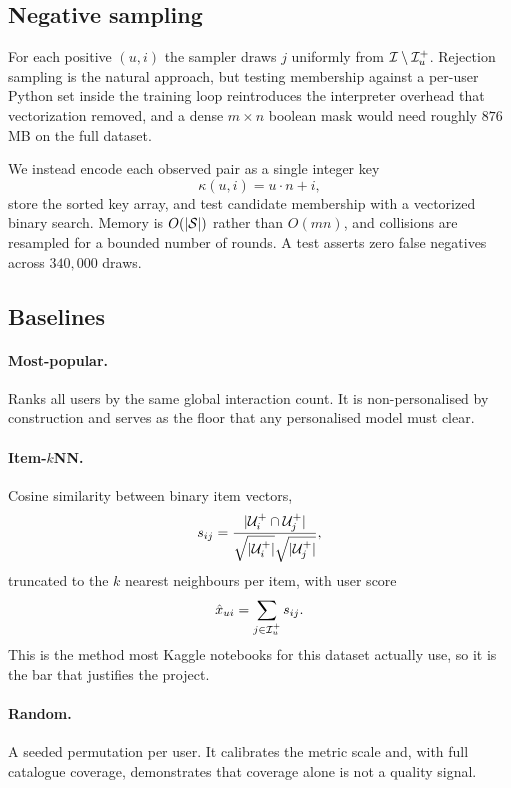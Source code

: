 \subsection{Negative sampling}

For each positive $(u,i)$ the sampler draws $j$ uniformly from
$\mathcal{I} \setminus \mathcal{I}_u^{+}$. Rejection sampling is the natural approach,
but testing membership against a per-user Python set inside the training loop
reintroduces the interpreter overhead that vectorization removed, and a dense
$m \times n$ boolean mask would need roughly $876$\,MB on the full dataset.

We instead encode each observed pair as a single integer key
\begin{equation}
  \kappa(u,i) = u \cdot n + i ,
\end{equation}
store the sorted key array, and test candidate membership with a vectorized
binary search. Memory is $O(|\mathcal{S}|)$ rather than $O(mn)$, and collisions are
resampled for a bounded number of rounds. A test asserts zero false negatives
across $340{,}000$ draws.

\subsection{Baselines}

\paragraph{Most-popular.} Ranks all users by the same global interaction
count. It is non-personalised by construction and serves as the floor that
any personalised model must clear.

\paragraph{Item-$k$NN.} Cosine similarity between binary item vectors,
\begin{equation}
  s_{ij} = \frac{\lvert \mathcal{U}_i^{+} \cap \mathcal{U}_j^{+} \rvert}
                {\sqrt{\lvert \mathcal{U}_i^{+} \rvert}\sqrt{\lvert \mathcal{U}_j^{+} \rvert}} ,
\end{equation}
truncated to the $k$ nearest neighbours per item, with user score
\begin{equation}
  \hat{x}_{ui} = \sum_{j \in \mathcal{I}_u^{+}} s_{ij} .
\end{equation}
This is the method most Kaggle notebooks for this dataset actually use, so it
is the bar that justifies the project.

\paragraph{Random.} A seeded permutation per user. It calibrates the metric
scale and, with full catalogue coverage, demonstrates that coverage alone is
not a quality signal.
